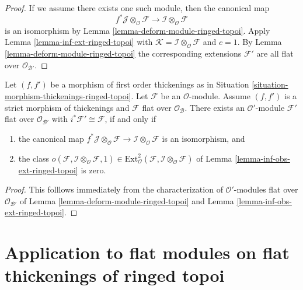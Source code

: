 \begin{proof}
If we assume there exists one such module, then the canonical map
$$
f^*\mathcal{J} \otimes_\mathcal{O} \mathcal{F} \to
\mathcal{I} \otimes_\mathcal{O} \mathcal{F}
$$
is an isomorphism by Lemma \ref{lemma-deform-module-ringed-topoi}. Apply
Lemma \ref{lemma-inf-ext-ringed-topoi} with $\mathcal{K} = 
\mathcal{I} \otimes_\mathcal{O} \mathcal{F}$
and $c = 1$. By Lemma \ref{lemma-deform-module-ringed-topoi}
the corresponding extensions
$\mathcal{F}'$ are all flat over $\mathcal{O}_{\mathcal{B}'}$.
\end{proof}

\begin{lemma}
\label{lemma-inf-obs-ext-rel-ringed-topoi}
Let $(f, f')$ be a morphism of first order thickenings as in
Situation \ref{situation-morphism-thickenings-ringed-topoi}.
Let $\mathcal{F}$ be an $\mathcal{O}$-module. Assume
$(f, f')$ is a strict morphism of thickenings
and $\mathcal{F}$ flat over $\mathcal{O}_\mathcal{B}$. There exists an
$\mathcal{O}'$-module $\mathcal{F}'$ flat over $\mathcal{O}_{\mathcal{B}'}$
with $i^*\mathcal{F}' \cong \mathcal{F}$, if and only if
\begin{enumerate}
\item the canonical map
$f^*\mathcal{J} \otimes_\mathcal{O} \mathcal{F} \to
\mathcal{I} \otimes_\mathcal{O} \mathcal{F}$
is an isomorphism, and
\item the class
$o(\mathcal{F}, \mathcal{I} \otimes_\mathcal{O} \mathcal{F}, 1)
\in \text{Ext}^2_\mathcal{O}(
\mathcal{F}, \mathcal{I} \otimes_\mathcal{O} \mathcal{F})$
of Lemma \ref{lemma-inf-obs-ext-ringed-topoi} is zero.
\end{enumerate}
\end{lemma}

\begin{proof}
This folllows immediately from the characterization of
$\mathcal{O}'$-modules flat over $\mathcal{O}_{\mathcal{B}'}$ of 
Lemma \ref{lemma-deform-module-ringed-topoi} and
Lemma \ref{lemma-inf-obs-ext-ringed-topoi}.
\end{proof}






\section{Application to flat modules on flat thickenings of ringed topoi}
\label{section-flat-ringed-topoi}

